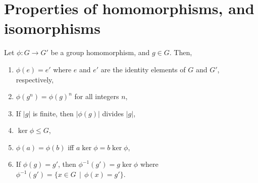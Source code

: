 \section{Properties of homomorphisms, and isomorphisms}
    \renewcommand{\leftmark}{May 13, 2024}

    \begin{thm}
        Let \(\phi : G \to G'\) be a group homomorphism, and \(g\in G\). Then, 
        \begin{enumerate}
            \item \(\phi(e) = e'\) where \(e\) and \(e'\) are the identity elements of \(G\) and \(G'\), respectively,
            \item \(\phi(g^n) = \phi(g)^n\) for all integers \(n\),
            \item If \(|g|\) is finite, then \(|\phi(g)|\) divides \(|g|\),
            \item \(\ker \phi \leq G\),
            \item \(\phi(a) = \phi(b)\) iff \(a\ker\phi = b\ker\phi\),
            \item If \(\phi(g) = g'\), then \(\phi^{-1}(g') = g\ker\phi\) where \(\phi^{-1}(g') = \{x\in G\,\mid\, \phi(x) = g'\}\).
        \end{enumerate}
    \end{thm}

